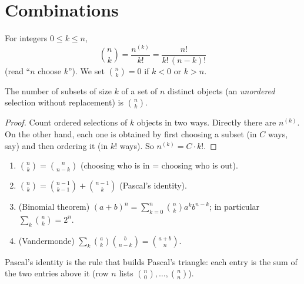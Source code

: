 \section{Combinations}

\begin{definition}
For integers $0 \le k \le n$,
\[
  \binom{n}{k} = \frac{n^{(k)}}{k!} = \frac{n!}{k!\,(n-k)!}
\]
(read ``$n$ choose $k$''). We set $\binom nk = 0$ if $k<0$ or $k>n$.
\end{definition}

\begin{theorem}
The number of subsets of size $k$ of a set of $n$ distinct objects (an \emph{unordered}
selection without replacement) is $\binom nk$.
\end{theorem}

\begin{proof}
Count ordered selections of $k$ objects in two ways. Directly there are $n^{(k)}$. On the
other hand, each one is obtained by first choosing a subset (in $C$ ways, say) and then
ordering it (in $k!$ ways). So $n^{(k)} = C\cdot k!$.
\end{proof}

\begin{theorem}
\begin{enumerate}
  \item $\binom nk = \binom{n}{n-k}$ (choosing who is in = choosing who is out).
  \item $\binom nk = \binom{n-1}{k-1} + \binom{n-1}{k}$ (Pascal's identity).
  \item (Binomial theorem) $(a+b)^n = \sum_{k=0}^n \binom nk a^k b^{n-k}$; in
        particular $\sum_k \binom nk = 2^n$.
  \item (Vandermonde) $\sum_{k} \binom{a}{k}\binom{b}{n-k} = \binom{a+b}{n}$.
\end{enumerate}
\end{theorem}


Pascal's identity is the rule that builds Pascal's triangle: each entry is the sum of the
two entries above it (row $n$ lists $\binom n0,\dots,\binom nn$).

